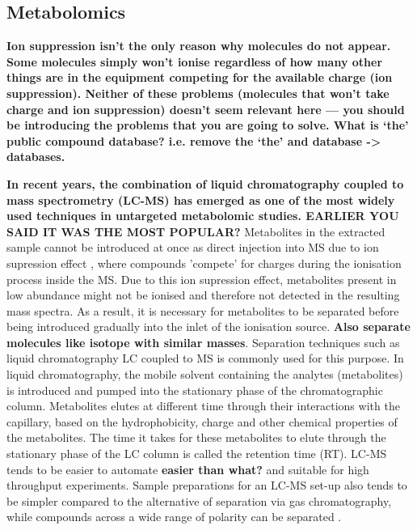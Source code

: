 \subsection{Metabolomics\label{metabolomics}}

\textbf{Ion suppression isn’t the only reason why molecules do not appear. Some molecules simply won’t ionise regardless of how many other things are in the equipment competing for the available charge (ion suppression). Neither of these problems (molecules that won’t take charge and ion suppression) doesn’t seem relevant here — you should be introducing the problems that you are going to solve. What is ‘the’ public compound database? i.e. remove the ‘the’ and database -> databases.}

\textbf{In recent years, the combination of liquid chromatography coupled to mass spectrometry (LC-MS) has emerged as one of the most widely used techniques in untargeted metabolomic studies. EARLIER YOU SAID IT WAS THE MOST POPULAR?} Metabolites in the extracted sample cannot be introduced at once as direct injection into MS due to ion supression effect \cite{Annesley2003}, where compounds 'compete' for charges during the ionisation process inside the MS. Due to this ion supression effect, metabolites present in low abundance might not be ionised and therefore not detected in the resulting mass spectra. As a result, it is necessary for metabolites to be separated before being introduced gradually into the inlet of the ionisation source. \textbf{Also separate molecules like isotope with similar masses}. Separation techniques such as liquid chromatography LC coupled to MS is commonly used for this purpose. In liquid chromatography, the mobile solvent containing the analytes (metabolites) is introduced and pumped into the stationary phase of the chromatographic column. Metabolites elutes at different time through their interactions with the capillary, based on the hydrophobicity, charge and other chemical properties of the metabolites. The time it takes for these metabolites to elute through the stationary phase of the LC column is called the retention time (RT). LC-MS tends to be easier to automate \textbf{easier than what?} and suitable for high throughput experiments. Sample preparations for an LC-MS set-up also tends to be simpler compared to the alternative of separation via gas chromatography, while compounds across a wide range of polarity can be separated \cite{Hoffmann2007}. 

